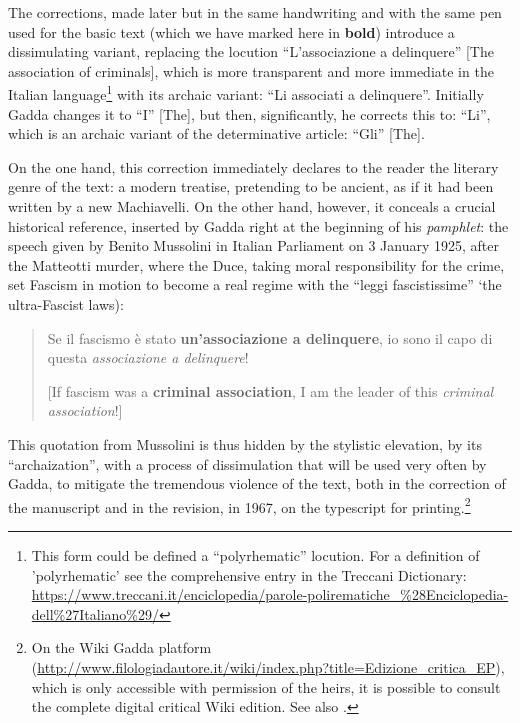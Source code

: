 \begin{paper}
\noindent The corrections, made later but in the same handwriting and with the
same pen used for the basic text (which we have marked here in
\textbf{bold}) introduce a dissimulating variant, replacing the
locution ``L'associazione a delinquere''  [The association of
criminals], which is more transparent and more immediate in the Italian language\footnote{This form could be defined a ``polyrhematic'' locution. For a  definition of 'polyrhematic' see the comprehensive entry in the
  Treccani Dictionary:
  \url{https://www.treccani.it/enciclopedia/parole-polirematiche_\%28Enciclopedia-dell\%27Italiano\%29/}}
with its archaic variant: ``Li associati a delinquere''. Initially Gadda changes it to ``I'' [The], but then, significantly, he corrects this to: ``Li'', which is
an archaic variant of the determinative article: ``Gli'' [The].

On the one hand, this correction immediately declares to the reader the
literary genre of the text: a modern treatise, pretending to be ancient,
as if it had been written by a new Machiavelli. On the other hand,
however, it conceals a crucial historical reference, inserted by Gadda
right at the beginning of his \emph{pamphlet}: the speech given by
Benito Mussolini in Italian Parliament on 3 January 1925, after the
Matteotti murder, where the Duce, taking moral responsibility for the
crime, set Fascism in motion to become a real regime with the ``leggi fascistissime''
`the ultra-Fascist laws):

\begin{quote}
    
Se il fascismo è stato \textbf{un'associazione a delinquere}, io sono il
capo di questa \emph{associazione a delinquere}!

\vspace{1em}

[If fascism was a \textbf{criminal association}, I am the leader of this \emph{criminal association}!]
\begin{flushright}
\parencite[13--14]{mussolini_discorsi_1926}
\end{flushright}
\end{quote}

\noindent This quotation from Mussolini is thus hidden by the stylistic elevation, by
its ``archaization'', with a process of dissimulation that will be used
very often by Gadda, to mitigate the tremendous violence of the text,
both in the correction of the manuscript and in the revision, in 1967,
on the typescript for printing.\footnote{On the Wiki Gadda platform
  (\url{http://www.filologiadautore.it/wiki/index.php?title=Edizione\_critica\_EP}), which is only accessible with permission of the heirs, it is possible to consult the complete digital critical Wiki edition. See also \cite{giuffrida_edizione_2016}.}


\end{paper}
